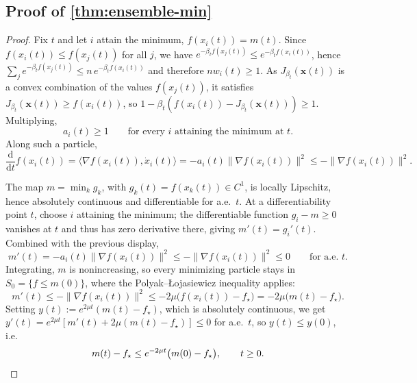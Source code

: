 \documentclass{article}
\newcommand{\dd}{\mathrm d}
\theoremstyle{plain}
\theoremstyle{definition}
\theoremstyle{remark}
\newcommand{\xx}{\mathbf{x}}
\begin{document}
\subsection{Proof of \texorpdfstring{\ref{thm:ensemble-min}}{Theorem 3.2}}

\begin{proof}
Fix \(t\) and let \(i\) attain the minimum, \(f(x_i(t))=m(t)\). Since \(f(x_i(t))\le f(x_j(t))\) for all \(j\), we have \(e^{-\beta_t f(x_j(t))}\le e^{-\beta_t f(x_i(t))}\), hence \(\sum_j e^{-\beta_t f(x_j(t))}\le n\,e^{-\beta_t f(x_i(t))}\) and therefore \(nw_i(t)\ge1\). As \(J_{\beta_t}(\xx(t))\) is a convex combination of the values \(f(x_j(t))\), it satisfies \(J_{\beta_t}(\xx(t))\ge f(x_i(t))\), so \(1-\beta_t(f(x_i(t))-J_{\beta_t}(\xx(t)))\ge1\). Multiplying,
\begin{equation}
    a_i(t)\ge1\qquad\text{for every }i\text{ attaining the minimum at }t .
    \label{eq:ai-ge-1}
\end{equation}
Along such a particle,
\[
    \frac{\dd}{\dd t}f(x_i(t))
    =\langle\nabla f(x_i(t)),\dot x_i(t)\rangle
    =-a_i(t)\|\nabla f(x_i(t))\|^2
    \le-\|\nabla f(x_i(t))\|^2 .
\]

The map \(m=\min_k g_k\), with \(g_k(t)=f(x_k(t))\in C^1\), is locally Lipschitz, hence absolutely continuous and differentiable for a.e.\ \(t\). At a differentiability point \(t\), choose \(i\) attaining the minimum; the differentiable function \(g_i-m\ge0\) vanishes at \(t\) and thus has zero derivative there, giving \(m'(t)=g_i'(t)\). Combined with the previous display,
\[
    m'(t)=-a_i(t)\|\nabla f(x_i(t))\|^2\le-\|\nabla f(x_i(t))\|^2\le0
    \qquad\text{for a.e. }t .
\]
Integrating, \(m\) is nonincreasing, so every minimizing particle stays in \(S_0=\{f\le m(0)\}\), where the Polyak--\L{}ojasiewicz inequality applies:
\[
    m'(t)\le-\|\nabla f(x_i(t))\|^2\le-2\mu\bigl(f(x_i(t))-f_\star\bigr)
    =-2\mu\bigl(m(t)-f_\star\bigr).
\]
Setting \(y(t):=e^{2\mu t}(m(t)-f_\star)\), which is absolutely continuous, we get \(y'(t)=e^{2\mu t}[m'(t)+2\mu(m(t)-f_\star)]\le0\) for a.e.\ \(t\), so \(y(t)\le y(0)\), i.e.
\[
    m(t)-f_\star\le e^{-2\mu t}\bigl(m(0)-f_\star\bigr),\qquad t\ge0 . \qedhere
\]
\end{proof}
\end{document}
